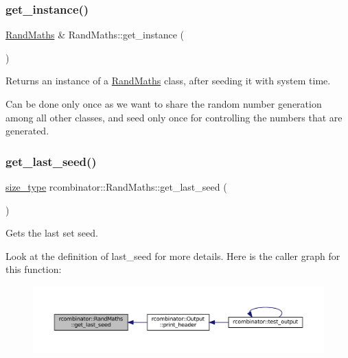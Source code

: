 \subsubsection{\texorpdfstring{get\+\_\+instance()}{get\_instance()}}
{\footnotesize\ttfamily \mbox{\hyperlink{classrcombinator_1_1RandMaths}{Rand\+Maths}} \& Rand\+Maths\+::get\+\_\+instance (\begin{DoxyParamCaption}{ }\end{DoxyParamCaption})\hspace{0.3cm}{\ttfamily [static]}}



Returns an instance of a \mbox{\hyperlink{classrcombinator_1_1RandMaths}{Rand\+Maths}} class, after seeding it with system time. 

Can be done only once as we want to share the random number generation among all other classes, and seed only once for controlling the numbers that are generated. \mbox{\label{classrcombinator_1_1RandMaths_acfc039a9fff053db88eb80df98caa69c}} 
\subsubsection{\texorpdfstring{get\+\_\+last\+\_\+seed()}{get\_last\_seed()}}
{\footnotesize\ttfamily \mbox{\hyperlink{constants_8h_abcd18a5521fc90ff6e7b00e4fee98397}{size\+\_\+type}} rcombinator\+::\+Rand\+Maths\+::get\+\_\+last\+\_\+seed (\begin{DoxyParamCaption}{ }\end{DoxyParamCaption})\hspace{0.3cm}{\ttfamily [inline]}}



Gets the last set seed. 

Look at the definition of last\+\_\+seed for more details. Here is the caller graph for this function\+:
\nopagebreak
\begin{figure}[H]
\begin{center}
\leavevmode
\includegraphics[width=350pt]{classrcombinator_1_1RandMaths_acfc039a9fff053db88eb80df98caa69c_icgraph}
\end{center}
\end{figure}
\mbox{\label{classrcombinator_1_1RandMaths_a8072bad64e64ef042e5257e1bee85635}} 

